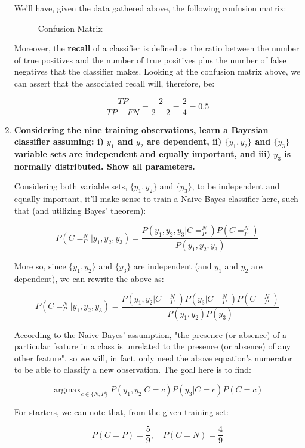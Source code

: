 \documentclass[12pt]{article}
\begin{document}
\begin{enumerate}[leftmargin=\labelsep]
  We'll have, given the data gathered above, the following confusion matrix:

  \begin{figure}[H]
    \centering
    
    \caption{Confusion Matrix}
  \end{figure}

  Moreover, the \textbf{recall} of a classifier is defined as the ratio between the number of
  true positives and the number of true positives plus the number of false negatives that the
  classifier makes. Looking at the confusion matrix above, we can assert that the associated
  recall will, therefore, be:

  $$
  \frac{TP}{TP + FN} = \frac{2}{2 + 2} = \frac{2}{4} = 0.5
  $$

  \pagebreak

  \item \textbf{Considering the nine training observations, learn a Bayesian classifier assuming:
  i) $y_1$ and $y_2$ are dependent, ii) $\{y_1 , y_2\}$ and $\{y_3 \}$ variable sets are
  independent and equally important, and iii) $y_3$ is normally distributed. Show all parameters.}

  Considering both variable sets, $\{y_1, y_2\}$ and $\{y_3\}$, to be independent and equally important,
  it'll make sense to train a Naive Bayes classifier here, such that (and utilizing
  Bayes' theorem):

  $$
  P(C = ^N_P | y_1, y_2, y_3) = \frac{P(y_1, y_2, y_3 | C = ^N_P) P(C = ^N_P)}{P(y_1, y_2, y_3)}
  $$

  More so, since $\{y_1, y_2\}$ and $\{y_3\}$ are independent (and $y_1$ and $y_2$ are dependent),
  we can rewrite the above as:

  $$
  P(C = ^N_P | y_1, y_2, y_3) = \frac{P(y_1, y_2 | C = ^N_P) P(y_3 | C = ^N_P) P(C = ^N_P)}{P(y_1, y_2) P(y_3)}
  $$

  According to the Naive Bayes' assumption, "the presence (or absence) of a particular feature
  in a class is unrelated to the presence (or absence) of any other feature", so we will, in fact,
  only need the above equation's numerator to be able to classify a new observation.
  The goal here is to find:

  $$
  \operatorname{argmax}_{c \in \{N, P\}} P(y_1, y_2 | C = c) P(y_3 | C = c) P(C = c)
  $$

  For starters, we can note that, from the given training set:
  
  $$
  P(C = P) = \frac{5}{9}, \quad P(C = N) = \frac{4}{9}
  $$


\end{enumerate}
\end{document}
